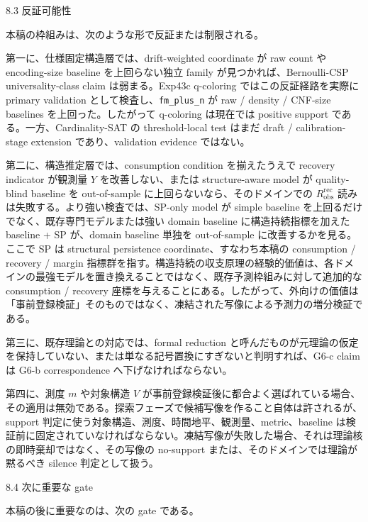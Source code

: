 \documentclass[12pt,a4paper]{article}
\begin{document}
8.3 反証可能性

本稿の枠組みは、次のような形で反証または制限される。

第一に、仕様固定構造層では、drift-weighted coordinate が raw count や encoding-size baseline を上回らない独立 family が見つかれば、Bernoulli-CSP universality-class claim は弱まる。Exp43c q-coloring ではこの反証経路を実際に primary validation として検査し、\texttt{fm\_plus\_n} が raw / density / CNF-size baselines を上回った。したがって q-coloring は現在では positive support である。一方、Cardinality-SAT の threshold-local test はまだ draft / calibration-stage extension であり、validation evidence ではない。

第二に、構造推定層では、consumption condition を揃えたうえで recovery indicator が観測量 \(Y\) を改善しない、または structure-aware model が quality-blind baseline を out-of-sample に上回らないなら、そのドメインでの \(R_{\mathrm{obs}}^{\mathrm{rec}}\) 読みは失敗する。より強い検査では、SP-only model が simple baseline を上回るだけでなく、既存専門モデルまたは強い domain baseline に構造持続指標を加えた baseline + SP が、domain baseline 単独を out-of-sample に改善するかを見る。ここで SP は structural persistence coordinate、すなわち本稿の consumption / recovery / margin 指標群を指す。構造持続の収支原理の経験的価値は、各ドメインの最強モデルを置き換えることではなく、既存予測枠組みに対して追加的な consumption / recovery 座標を与えることにある。したがって、外向けの価値は「事前登録検証」そのものではなく、凍結された写像による予測力の増分検証である。

第三に、既存理論との対応では、formal reduction と呼んだものが元理論の仮定を保持していない、または単なる記号置換にすぎないと判明すれば、G6-c claim は G6-b correspondence へ下げなければならない。

第四に、測度 \(m\) や対象構造 \(V\) が事前登録検証後に都合よく選ばれている場合、その適用は無効である。探索フェーズで候補写像を作ること自体は許されるが、support 判定に使う対象構造、測度、時間地平、観測量、metric、baseline は検証前に固定されていなければならない。凍結写像が失敗した場合、それは理論核の即時棄却ではなく、その写像の no-support または、そのドメインでは理論が黙るべき silence 判定として扱う。

8.4 次に重要な gate

本稿の後に重要なのは、次の gate である。
\end{document}
